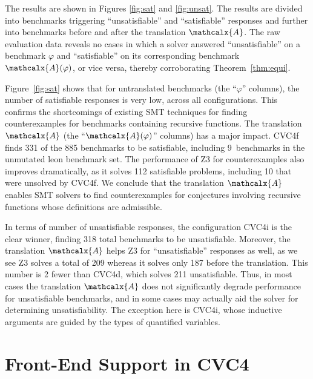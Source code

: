 \documentclass[runningheads,a4paper]{llncs}
\newcommand\cvcd{CVC4d\xspace}
\newcommand\cvcf{CVC4f\xspace}
\newcommand\cvci{CVC4i\xspace}
\newcommand\ziiib{\ziii}
\newcommand\bench{\ttfamily}
\newcommand\ziii{Z3\xspace}
\newcommand{\conv}{\mathcalx{A}}
\begin{document}
The results are shown in Figures \ref{fig:sat} and \ref{fig:unsat}.
The results are divided into benchmarks triggering ``unsatisfiable'' and ``satisfiable''
responses and further into benchmarks before and after the translation $\conv$.
The raw evaluation data reveals no cases in which a solver answered
``unsatisfiable'' on a benchmark $\varphi$ and ``satisfiable'' on its
corresponding benchmark $\conv( \varphi )$, or vice versa, thereby
corroborating Theorem~\ref{thm:equi}.

Figure~\ref{fig:sat} shows that for untranslated benchmarks (the ``$\varphi$''
columns), the number of satisfiable responses is very low, across all
configurations. This confirms the shortcomings of existing SMT techniques for
finding counterexamples for benchmarks containing recursive functions.
%
The translation $\conv$ (the ``$\conv(\varphi)$'' columns) has a major
impact. \cvcf finds 331 of the 885 benchmarks to be satisfiable,
including 9~benchmarks in the unmutated {\bench leon} benchmark set. The
performance of \ziiib for counterexamples also improves dramatically, as it
solves 112 satisfiable problems, including 10 that were unsolved by \cvcf.
%
We conclude that the translation $\conv$ enables SMT
solvers to find counterexamples for conjectures involving recursive functions
whose definitions are admissible.

In terms of number of unsatisfiable responses, the configuration \cvci is the
clear winner, finding 318 total benchmarks to be unsatisfiable. Moreover, the
translation $\conv$ helps \ziii for ``unsatisfiable'' responses as well, as we
see \ziii solves a total of 209 whereas it solves only 187 before the
translation.
%
This number is 2 fewer than \cvcd, which solves 211 unsatisfiable. Thus, in
most cases the translation $\conv$ does not significantly degrade performance
for unsatisfiable benchmarks, and in some cases may actually aid the solver for
determining unsatisfiability. The exception here is \cvci, whose inductive
arguments are guided by the types of quantified variables.

\section{Front-End Support %
  in CVC4}
\label{sec:front-end}
\end{document}
